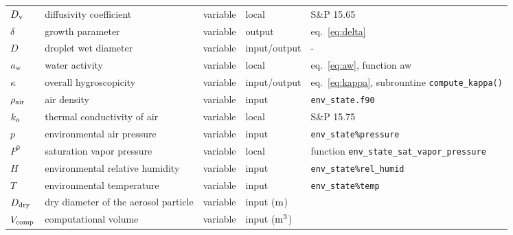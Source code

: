 \documentclass{article}
\begin{document}
\begin{tabular}{lp{4cm}clp{3cm}}
\hline
$D_{\rm v}$     & diffusivity coefficient   &  variable & local &  S\&P 15.65  \\
$\delta$  & growth parameter &  variable & output & eq.~\ref{eq:delta}\\
$D$     &  droplet wet diameter  & variable  & input/output &   -   \\
$a_{\rm w}$  & water activity  &variable & local & eq.~\ref{eq:aw},  function aw  \\
$\kappa$      &  overall hygroscopicity   &  variable & input/output  &  eq.~\ref{eq:kappa}, subrountine \verb+compute_kappa()+   \\
$ \rho_{\rm air}$    &  air density   &  variable  & input  &  \verb+env_state.f90+   \\
$k_{\rm a} $     & thermal conductivity of air    &  variable & local &   S\&P 15.75   \\
$p$     &  environmental air pressure &  variable  & input  &  \verb+env_state%pressure+ \\
$P^0$   & saturation vapor pressure &  variable & local &  function \verb+env_state_sat_vapor_pressure+  \\
$H$     &  environmental relative humidity  &  variable  & input  &  \verb+env_state%rel_humid+  \\
$T$     &  environmental temperature  &  variable  & input  &  \verb+env_state%temp+  \\
$D_{\rm dry}$       & dry diameter of the aerosol particle   &  variable  & input ($\rm m$) &    \\
$V_{\rm comp}$ & computational volume & variable & input ($\rm m^3$) & \\
\hline 
\end{tabular}
\end{document}
